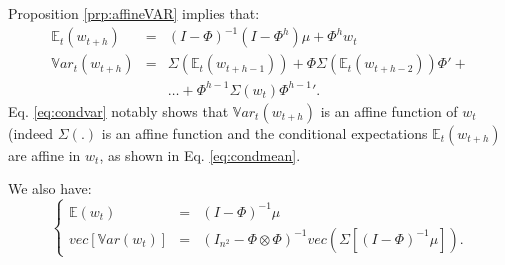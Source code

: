 \documentclass[
  12pt,
]{book}
\theoremstyle{definition}
\theoremstyle{definition}
\theoremstyle{definition}
\theoremstyle{definition}
\theoremstyle{remark}
\begin{document}
Proposition \ref{prp:affineVAR} implies that:
\begin{eqnarray}
\mathbb{E}_t(w_{t+h}) &=& (I - \Phi)^{-1}(I - \Phi^h)\mu + \Phi^h w_t \label{eq:condmean}\\
\mathbb{V}ar_t(w_{t+h}) &=& \Sigma(\mathbb{E}_t(w_{t+h-1}))+\Phi \Sigma(\mathbb{E}_t(w_{t+h-2}))\Phi' + \nonumber \\
&& \dots + \Phi^{h-1} \Sigma(w_{t}){\Phi^{h-1}}'. \label{eq:condvar}
\end{eqnarray}
Eq. \eqref{eq:condvar} notably shows that \(\mathbb{V}ar_t(w_{t+h})\) is an affine function of \(w_t\) (indeed \(\Sigma(.)\) is an affine function and the conditional expectations \(\mathbb{E}_t(w_{t+h})\) are affine in \(w_t\), as shown in Eq. \eqref{eq:condmean}.

We also have:
\begin{equation}
\left\{
\begin{array}{ccl}
\mathbb{E}(w_t) &=& (I - \Phi)^{-1}\mu\\
vec[\mathbb{V}ar(w_t)] &=& (I_{n^2} - \Phi \otimes \Phi)^{-1} vec\left(\Sigma[(I - \Phi)^{-1}\mu]\right).
\end{array}
\right.\label{eq:uncondmeanvar}
\end{equation}
\end{document}
